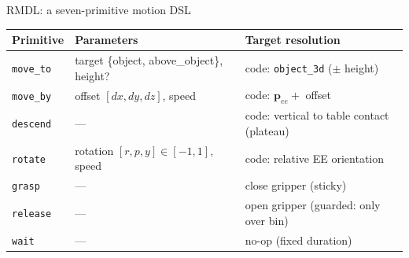 \documentclass[aspectratio=169,10pt]{beamer}
\begin{document}
\begin{frame}{RMDL: a seven-primitive motion DSL}
\centering
\footnotesize
\begin{tabular}{@{}lll@{}}
\toprule
\textbf{Primitive} & \textbf{Parameters} & \textbf{Target resolution} \\
\midrule
\texttt{move\_to} & target \{object, above\_object\}, height? & code: \texttt{object\_3d} ($\pm$ height) \\
\texttt{move\_by} & offset $[dx,dy,dz]$, speed & code: $\mathbf{p}_{ee}+$ offset \\
\texttt{descend}  & --- & code: vertical to table contact (plateau) \\
\texttt{rotate}   & rotation $[r,p,y]\!\in\![-1,1]$, speed & code: relative EE orientation \\
\texttt{grasp}    & --- & close gripper (sticky) \\
\texttt{release}  & --- & open gripper (guarded: only over bin) \\
\texttt{wait}     & --- & no-op (fixed duration) \\
\bottomrule
\end{tabular}
\vspace{6pt}
\end{frame}
\end{document}
